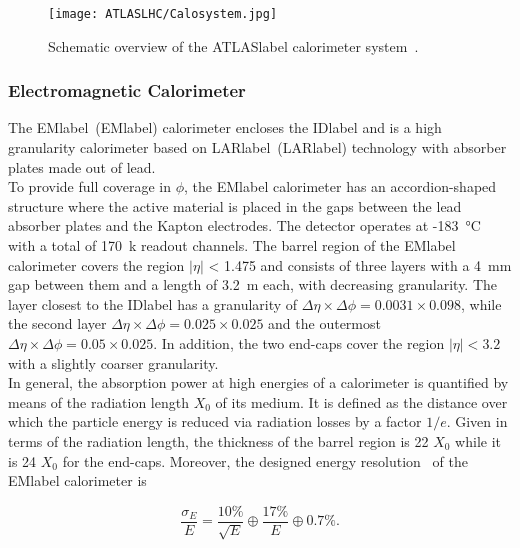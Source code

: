 \begin{figure}[htbp]
    \RawFloats
    \begin{center}
    \texttt{[image: ATLASLHC/Calosystem.jpg]}
    \caption{
        Schematic overview of the \acrshort{ATLASlabel} calorimeter system~\cite{Collaboration_2008}. 
    }
    \label{figLHC:ATLASCalo}
    \end{center}
\end{figure}

\subsubsection*{Electromagnetic Calorimeter}

The \acrlong{EMlabel}~(\acrshort{EMlabel}) calorimeter encloses the \acrshort{IDlabel} and is a high granularity calorimeter based on \acrlong{LARlabel}~(\acrshort{LARlabel}) technology with absorber plates made out of lead.\\

To provide full coverage in $\phi$, the \acrshort{EMlabel} calorimeter has an accordion-shaped structure where the active material is placed in the gaps between the lead absorber plates and the Kapton electrodes. The detector operates at -183~°C with a total of 170~k readout channels. The barrel region of the \acrshort{EMlabel} calorimeter covers the region $|\eta|$ < 1.475 and consists of three layers with a 4~mm gap between them and a length of 3.2~m each, with decreasing granularity. The layer closest to the \acrshort{IDlabel} has a granularity of $\Delta\eta\times\Delta\phi= 0.0031\times 0.098$, while the second layer $\Delta\eta\times\Delta\phi= 0.025\times 0.025$ and the outermost $\Delta\eta\times\Delta\phi= 0.05\times 0.025$. In addition, the two end-caps cover the region $|\eta| < 3.2$ with a slightly coarser granularity.\\

In general, the absorption power at high energies of a calorimeter is quantified by means of the radiation length $X_0$ of its medium. It is defined as the distance over which the particle energy is reduced via radiation losses by a factor $1/e$. Given in terms of the radiation length, the thickness of the barrel region is 22 $X_0$ while it is 24 $X_0$ for the end-caps. Moreover, the designed energy resolution~\cite{Collaboration_2008} of the \acrshort{EMlabel} calorimeter is

\begin{equation}
    \frac{\sigma_E}{E} = \frac{10\%}{\sqrt{E}}\oplus\frac{17\%}{E}\oplus 0.7\%.
\end{equation}


